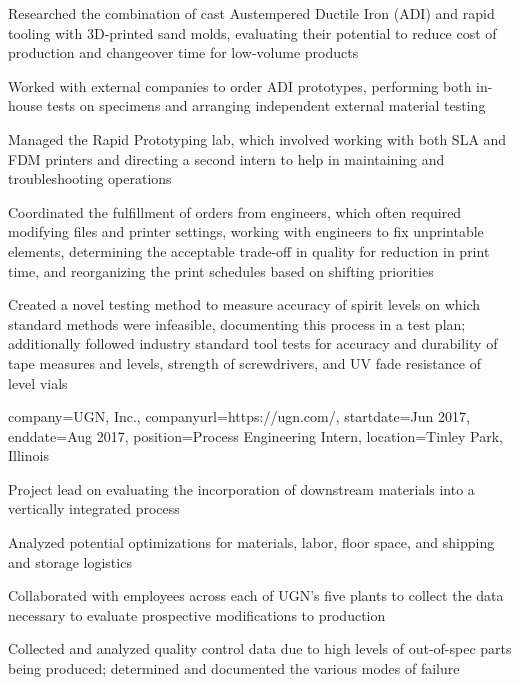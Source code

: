 \documentclass[10pt]{article}
\begin{document}
\begin{resume_sec}
\begin{subsec}
        \item Researched the combination of cast Austempered Ductile Iron (ADI) and rapid tooling with 3D-printed sand molds, evaluating their potential to reduce cost of production and changeover time for low-volume products
        \item Worked with external companies to order ADI prototypes, performing both in-house tests on specimens and arranging independent external material testing
        \item Managed the Rapid Prototyping lab, which involved working with both SLA and FDM printers and directing a second intern to help in maintaining and troubleshooting operations
        \item Coordinated the fulfillment of orders from engineers, which often required modifying files and printer settings, working with engineers to fix unprintable elements, determining the acceptable trade-off in quality for reduction in print time, and reorganizing the print schedules based on shifting priorities
        \item Created a novel testing method to measure accuracy of spirit levels on which standard methods were infeasible, documenting this process in a test plan; additionally followed industry standard tool tests for accuracy and durability of tape measures and levels, strength of screwdrivers, and UV fade resistance of level vials
    \end{subsec}
    
    \begin{subsec}
        {
            company={UGN, Inc.},
            companyurl={https://ugn.com/},
            startdate={Jun 2017},
            enddate={Aug 2017},
            position={Process Engineering Intern},
            location={Tinley Park, Illinois}
        }
        
        \item Project lead on evaluating the incorporation of downstream materials into a vertically integrated process
        \item Analyzed potential optimizations for materials, labor, floor space, and shipping and storage logistics
        \item Collaborated with employees across each of UGN's five plants to collect the data necessary to evaluate prospective modifications to production
        \item Collected and analyzed quality control data due to high levels of out-of-spec parts being produced; determined and documented the various modes of failure
    \end{subsec}
    
    \vspace{-2pt}

\end{resume_sec}
\end{document}
